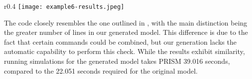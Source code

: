 \begin{comment}
   [NGRDF] (Network=0)  $\rightarrow$  
   	1 : (set2'=addBlockSet(set2,b2))$\&$(set3'=addBlockSet(set3,b3))$\&$(set4'=addBlockSet(set4,b4))$\&$(set5'=addBlockSet(set5,b5))$\&$(Network'=0); 
   [PCRLD] (Network=0)  $\rightarrow$  
   	1 : (set2'=addBlockSet(set2,b2))$\&$(set3'=addBlockSet(set3,b3))$\&$(set4'=addBlockSet(set4,b4))$\&$(set5'=addBlockSet(set5,b5))$\&$(Network'=0); 
   [MDDCF] (Network=0)  $\rightarrow$  1 : (set1' = removeBlock(set1,b1))$\&$(Network'=0); 
   [IQVPA] (Network=0)  $\rightarrow$  1 : (set1' = removeBlock(set1,b1))$\&$(Network'=0); 
   $\ldots$
endmodule

module Vote_Manager
   Vote_Manager : [0..1] init 0;
   epoch : [0..10] init 0;
   Votes : hash[];  
   tot_stake : [0..120000] init 50; 
   stake1 : [0..N] init 10; 
   stake2 : [0..N] init 10; 
   stake3 : [0..N] init 10; 
   stake4 : [0..N] init 10; 
   stake5 : [0..N] init 10; 

   [VSJBE] (Vote_Manager=0)  $\rightarrow$  
   	1 : (Votes'=addVote(Votes,b1,stake1))$\&$(Vote_Manager'=0); 
   $\ldots$
endmodule

\end{lstlisting}
\end{comment}

\begin{wrapfigure}{r}{0.4\textwidth}
	\vspace{-0.75cm}
	\centering
	\texttt{[image: example6-results.jpeg]}	
	\caption{}
	\vspace{-0.25cm}
	\label{ex5-res}
	\vspace{-0.25cm}
	\end{wrapfigure}
The code closely resembles the one outlined in \cite{DBLP:journals/distribledger/GallettaLMV23}, with the main distinction being the greater number of lines in our generated model. 
This difference is due to the fact that certain commands could be combined, but our generation lacks the automatic capability to perform this check. While the results exhibit similarity, running simulations for the generated model takes PRISM 39.016 seconds, compared to the 22.051 seconds required for the original model.


